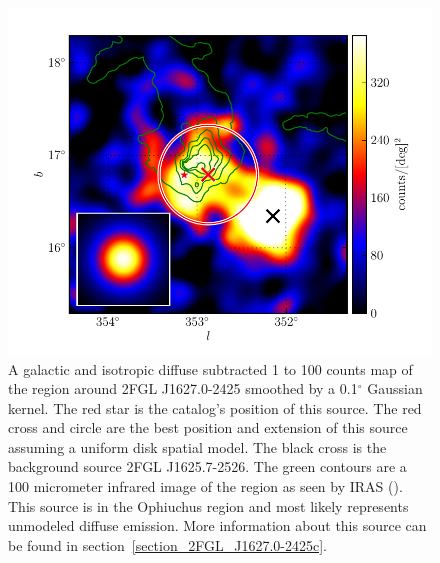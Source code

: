 \documentclass[12pt,preprint]{aastex}
\newcommand{\gev}{\text{GeV}\xspace}
\renewcommand{\deg}{\ensuremath{^\circ}\xspace}
\begin{document}
\begin{figure}
  \begin{center}
    \includegraphics[type=pdf,ext=.pdf,read=.pdf]{source_plots/source_1FGL_J1628.6-2419c}
  \end{center}
  \caption{
  A galactic and isotropic diffuse subtracted 1 \gev to 100 \gev counts
  map of the region around 2FGL J1627.0-2425 smoothed by a 0.1\deg
  Gaussian kernel.  The red star is the catalog's position of
  this source.  The red cross and circle are
  the best position and extension of this source assuming a
  uniform disk spatial model.  The black cross is the background source
  2FGL J1625.7-2526.  The green contours are a 100 micrometer infrared
  image of the region as seen by IRAS (\cite{iras_rho_ophiuci}). This
  source is in the Ophiuchus region and most likely represents 
  unmodeled diffuse emission.  More information about this source can be found
  in section~\ref{section_2FGL_J1627.0-2425c}.
  }\label{1FGL_J1628.6-2419c}
\end{figure}
\end{document}
